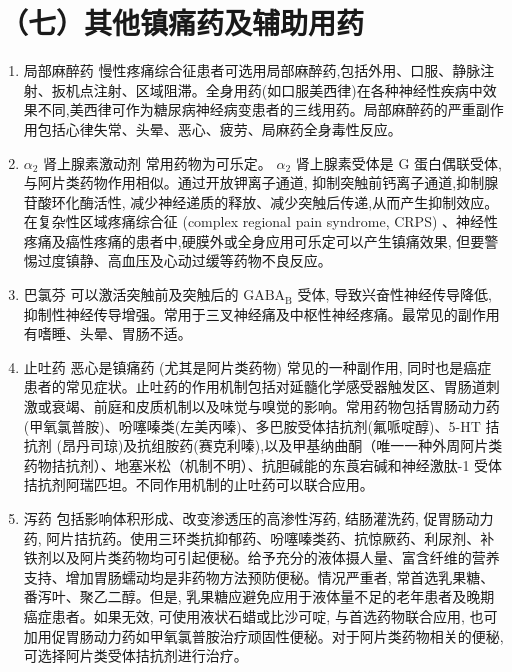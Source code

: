 \documentclass[10pt]{article}
\begin{document}
\section*{（七）其他镇痛药及辅助用药}
\begin{enumerate}
  \item 局部麻醉药 慢性疼痛综合征患者可选用局部麻醉药,包括外用、口服、静脉注射、扳机点注射、区域阻滞。全身用药(如口服美西律)在各种神经性疾病中效果不同,美西律可作为糖尿病神经病变患者的三线用药。局部麻醉药的严重副作用包括心律失常、头晕、恶心、疲劳、局麻药全身毒性反应。

  \item $\alpha_{2}$ 肾上腺素激动剂 常用药物为可乐定。 $\alpha_{2}$ 肾上腺素受体是 $\mathrm{G}$ 蛋白偶联受体,与阿片类药物作用相似。通过开放钾离子通道, 抑制突触前钙离子通道,抑制腺苷酸环化酶活性, 减少神经递质的释放、减少突触后传递,从而产生抑制效应。在复杂性区域疼痛综合征 (complex regional pain syndrome, CRPS) 、神经性疼痛及癌性疼痛的患者中,硬膜外或全身应用可乐定可以产生镇痛效果, 但要警惕过度镇静、高血压及心动过缓等药物不良反应。

  \item 巴氯芬 可以激活突触前及突触后的 $\mathrm{GABA}_{\mathrm{B}}$ 受体, 导致兴奋性神经传导降低, 抑制性神经传导增强。常用于三叉神经痛及中枢性神经疼痛。最常见的副作用有嗜睡、头晕、胃肠不适。

  \item 止吐药 恶心是镇痛药 (尤其是阿片类药物) 常见的一种副作用, 同时也是癌症患者的常见症状。止吐药的作用机制包括对延髓化学感受器触发区、胃肠道刺激或衰竭、前庭和皮质机制以及味觉与嗅觉的影响。常用药物包括胃肠动力药(甲氧氯普胺)、吩噻嗪类(左美丙嗪)、多巴胺受体拮抗剂(氟哌啶醇)、5-HT 拮抗剂 (昂丹司琼)及抗组胺药(赛克利嗪),以及甲基纳曲酮（唯一一种外周阿片类药物拮抗剂）、地塞米松（机制不明）、抗胆碱能的东莨宕碱和神经激肽-1 受体拮抗剂阿瑞匹坦。不同作用机制的止吐药可以联合应用。

  \item 泻药 包括影响体积形成、改变渗透压的高渗性泻药, 结肠灌洗药, 促胃肠动力药, 阿片拮抗药。使用三环类抗抑郁药、吩噻嗪类药、抗惊厥药、利尿剂、补铁剂以及阿片类药物均可引起便秘。给予充分的液体摄人量、富含纤维的营养支持、增加胃肠蠕动均是非药物方法预防便秘。情况严重者, 常首选乳果糖、番泻叶、聚乙二醇。但是, 乳果糖应避免应用于液体量不足的老年患者及晚期癌症患者。如果无效, 可使用液状石蜡或比沙可啶, 与首选药物联合应用, 也可加用促胃肠动力药如甲氧氯普胺治疗顽固性便秘。对于阿片类药物相关的便秘, 可选择阿片类受体拮抗剂进行治疗。

\end{enumerate}
\end{document}
